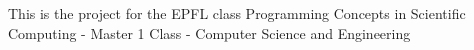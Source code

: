 This is the project for the E\+P\+FL class Programming Concepts in Scientific Computing -\/ Master 1 Class -\/ Computer Science and Engineering 